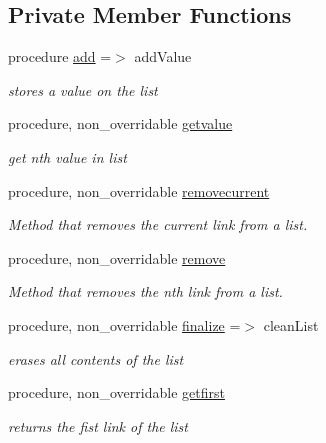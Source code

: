 \subsection*{Private Member Functions}
\begin{DoxyCompactItemize}
\item 
procedure \mbox{\hyperlink{structabstract__linkedlist__mod_1_1linkedlist_a691374958da432e733453e6feb895bb1}{add}} =$>$ add\+Value
\begin{DoxyCompactList}\small\item\em stores a value on the list \end{DoxyCompactList}\item 
procedure, non\+\_\+overridable \mbox{\hyperlink{structabstract__linkedlist__mod_1_1linkedlist_a5c7d60d9f9213b87eed9ce5350a72460}{getvalue}}
\begin{DoxyCompactList}\small\item\em get nth value in list \end{DoxyCompactList}\item 
procedure, non\+\_\+overridable \mbox{\hyperlink{structabstract__linkedlist__mod_1_1linkedlist_a7bca8c31961be692d5c377c309d6cbd2}{removecurrent}}
\begin{DoxyCompactList}\small\item\em Method that removes the current link from a list. \end{DoxyCompactList}\item 
procedure, non\+\_\+overridable \mbox{\hyperlink{structabstract__linkedlist__mod_1_1linkedlist_a8d5f5b478ec685dfdc93cb491d2d30f9}{remove}}
\begin{DoxyCompactList}\small\item\em Method that removes the nth link from a list. \end{DoxyCompactList}\item 
procedure, non\+\_\+overridable \mbox{\hyperlink{structabstract__linkedlist__mod_1_1linkedlist_af4fe24b10e4bdf057d3ed4a2fe2ff03c}{finalize}} =$>$ clean\+List
\begin{DoxyCompactList}\small\item\em erases all contents of the list \end{DoxyCompactList}\item 
procedure, non\+\_\+overridable \mbox{\hyperlink{structabstract__linkedlist__mod_1_1linkedlist_ae96f8c00f41925064249e443ce31f44a}{getfirst}}
\begin{DoxyCompactList}\small\item\em returns the fist link of the list \end{DoxyCompactList}\item 

\end{DoxyCompactItemize}
